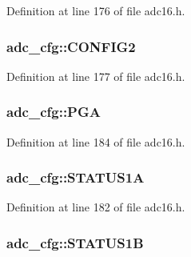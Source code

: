 Definition at line 176 of file adc16.\+h.

\subsubsection[{\texorpdfstring{C\+O\+N\+F\+I\+G2}{CONFIG2}}]{ adc\+\_\+cfg\+::\+C\+O\+N\+F\+I\+G2}\hypertarget{structadc__cfg_a7a58f1efd0fdb205cc82cc06adcd71b2}{}\label{structadc__cfg_a7a58f1efd0fdb205cc82cc06adcd71b2}


Definition at line 177 of file adc16.\+h.

\subsubsection[{\texorpdfstring{P\+GA}{PGA}}]{ adc\+\_\+cfg\+::\+P\+GA}\hypertarget{structadc__cfg_a1d628ac45e7b90529d1f055af07639ae}{}\label{structadc__cfg_a1d628ac45e7b90529d1f055af07639ae}


Definition at line 184 of file adc16.\+h.

\subsubsection[{\texorpdfstring{S\+T\+A\+T\+U\+S1A}{STATUS1A}}]{ adc\+\_\+cfg\+::\+S\+T\+A\+T\+U\+S1A}\hypertarget{structadc__cfg_a2fc37049fe67234135c4f18dfa94cbba}{}\label{structadc__cfg_a2fc37049fe67234135c4f18dfa94cbba}


Definition at line 182 of file adc16.\+h.

\subsubsection[{\texorpdfstring{S\+T\+A\+T\+U\+S1B}{STATUS1B}}]{ adc\+\_\+cfg\+::\+S\+T\+A\+T\+U\+S1B}\hypertarget{structadc__cfg_ad7d6f39059955d2a403dcfd5feeec073}{}\label{structadc__cfg_ad7d6f39059955d2a403dcfd5feeec073}


